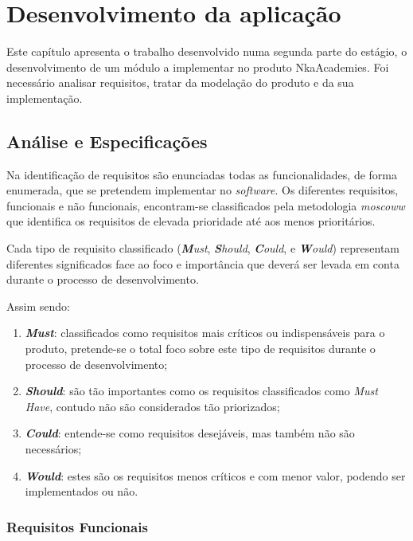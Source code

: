 
\chapter{Desenvolvimento da aplicação}

Este capítulo apresenta o trabalho desenvolvido numa segunda parte do estágio, o desenvolvimento de um módulo a implementar no produto NkaAcademies. Foi necessário analisar requisitos, tratar da modelação do produto e da sua implementação.

\section{Análise e Especificações}

Na identificação de requisitos são enunciadas todas as funcionalidades, de forma enumerada, que se pretendem implementar no \textit{software}.
Os diferentes requisitos, funcionais e não funcionais, encontram-se classificados pela metodologia \textit{\gls{moscoww}} que identifica os requisitos de elevada prioridade até aos menos prioritários.

Cada tipo de requisito classificado (\textit{\textbf{M}ust}, \textit{\textbf{S}hould}, \textit{\textbf{C}ould}, e \textit{\textbf{W}ould}) representam diferentes significados face ao foco e importância que deverá ser levada em conta durante o processo de desenvolvimento.

Assim sendo:


\begin{enumerate}
  \item \textbf{\textit{Must}}: classificados como requisitos mais críticos ou indispensáveis para o produto, pretende-se o total foco sobre este tipo de requisitos durante o processo de desenvolvimento;
  \item \textbf{\textit{Should}}: são tão importantes como os requisitos classificados como \textit{Must Have}, contudo não são considerados tão priorizados;
  \item \textbf{\textit{Could}}: entende-se como requisitos desejáveis, mas também não são necessários;
  \item \textbf{\textit{Would}}: estes são os requisitos menos críticos e com menor valor, podendo ser implementados ou não.
\end{enumerate}

\subsection{Requisitos Funcionais}

